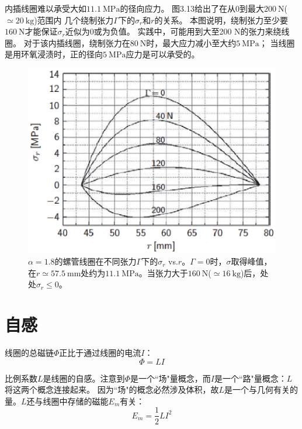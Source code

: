 内插线圈难以承受大如$11.1\ \mathrm{MPa}$的径向应力。
图3.13给出了在从0到最大$200\ \mathrm{N}$($\simeq 20\ \mathrm{kg}$)范围内
几个绕制张力$\Gamma$下的$\sigma_{r}$和$r$的关系。
本图说明，绕制张力至少要$160\ \mathrm{N}$才能保证$\sigma_{r}$近似为0或为负值。
实践中，可能用到大至200 N的张力来绕线圈。
对于该内插线圈，绕制张力在$80\ \mathrm{N}$时，最大应力减小至大约$5\ \mathrm{MPa}$；
当线圈是用环氧浸渍时，正的径向$5\ \mathrm{MPa}$应力是可以承受的。
\begin{figure}[htbp]
  \centering
 \includegraphics[scale=0.7]{chpt3/figs/fig3.13.eps}
  \caption{$\alpha=1.8$的螺管线圈在不同张力$\Gamma$下的$\sigma_r$ vs.$r$。$\Gamma=0$时，$\sigma$取得峰值，在$r\simeq 57.5\ \mathrm{mm}$处约为$11.1\ \mathrm{MPa}$。当张力大于$160\ \mathrm{N}$($\simeq 16\ \mathrm{kg}$)后，处处$\sigma_r\le 0 $。}
\end{figure}





\section{自感}
线圈的总磁链$\Phi$正比于通过线圈的电流$I$：
\begin{equation}
 \Phi=LI %
\end{equation}

比例系数$L$是线圈的自感。注意到$\Phi$是一个``场"量概念，而$I$是一个``路"量概念：$L$将这两个概念连接起来。
因为``场"的概念必然涉及体积，故$L$是一个与几何有关的量。$L$还与线圈中存储的磁能$E_m$有关：
\begin{equation}
 E_m=\frac{1}{2}LI^2 %
\end{equation}

